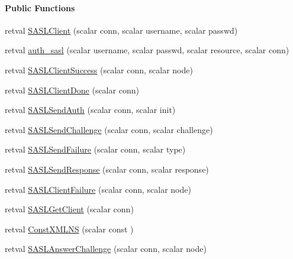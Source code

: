 \begin{Indent}\paragraph*{\-Public \-Functions}
\begin{DoxyCompactItemize}
\item 
retval \hyperlink{class_d_jabberd_1_1_stanza_1_1_s_a_s_l_a5bd1ff7ecd1b59c7b31202e0a92d79f9}{\-S\-A\-S\-L\-Client} (scalar conn, scalar username, scalar passwd)
\item 
retval \hyperlink{class_d_jabberd_1_1_stanza_1_1_s_a_s_l_a4162f52dd15d5e2a4b8db24dd52e3c62}{auth\-\_\-sasl} (scalar username, scalar passwd, scalar resource, scalar conn)
\item 
retval \hyperlink{class_d_jabberd_1_1_stanza_1_1_s_a_s_l_af97563a65cfdbd0265e9c1a16b47cc7b}{\-S\-A\-S\-L\-Client\-Success} (scalar conn, scalar node)
\item 
retval \hyperlink{class_d_jabberd_1_1_stanza_1_1_s_a_s_l_a7cb1d66173d5379919a21813af223299}{\-S\-A\-S\-L\-Client\-Done} (scalar conn)
\item 
retval \hyperlink{class_d_jabberd_1_1_stanza_1_1_s_a_s_l_a0bbe779fc0bad9c800456d896e2f8a1e}{\-S\-A\-S\-L\-Send\-Auth} (scalar conn, scalar init)
\item 
retval \hyperlink{class_d_jabberd_1_1_stanza_1_1_s_a_s_l_a63517c6db7e9caf25512244925298fe2}{\-S\-A\-S\-L\-Send\-Challenge} (scalar conn, scalar challenge)
\item 
retval \hyperlink{class_d_jabberd_1_1_stanza_1_1_s_a_s_l_a05e0c0cc8b549d0a85a8252f97dbcbd1}{\-S\-A\-S\-L\-Send\-Failure} (scalar conn, scalar type)
\item 
retval \hyperlink{class_d_jabberd_1_1_stanza_1_1_s_a_s_l_a2ebf135cd39968fd25c3e518649ec410}{\-S\-A\-S\-L\-Send\-Response} (scalar conn, scalar response)
\item 
retval \hyperlink{class_d_jabberd_1_1_stanza_1_1_s_a_s_l_aaddcd0197a673cf9a4059f2061e15044}{\-S\-A\-S\-L\-Client\-Failure} (scalar conn, scalar node)
\item 
retval \hyperlink{class_d_jabberd_1_1_stanza_1_1_s_a_s_l_a5b02285d87886ae0d3dab97c5bc2c84a}{\-S\-A\-S\-L\-Get\-Client} (scalar conn)
\item 
retval \hyperlink{class_d_jabberd_1_1_stanza_1_1_s_a_s_l_a3ae562dcad807f8a84a12e634c275dcf}{\-Const\-X\-M\-L\-N\-S} (scalar const )
\item 
retval \hyperlink{class_d_jabberd_1_1_stanza_1_1_s_a_s_l_ae58e72787b20f23453d0ced79c4e2c35}{\-S\-A\-S\-L\-Answer\-Challenge} (scalar conn, scalar node)

\end{DoxyCompactItemize}
\end{Indent}
